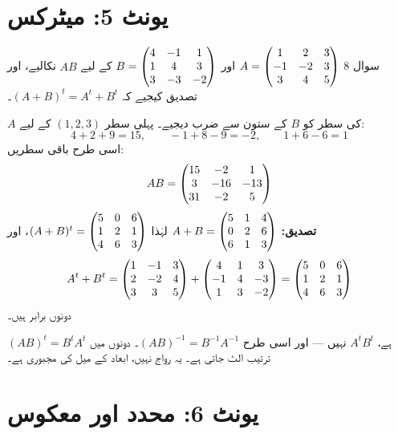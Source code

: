 \section*{یونٹ \textenglish{5}: میٹرکس}

\begin{sawal}{سوال \textenglish{8}}
\(A=\begin{pmatrix}1&2&3\\-1&-2&3\\3&4&5\end{pmatrix}\) اور \(B=\begin{pmatrix}4&-1&1\\1&4&3\\3&-3&-2\end{pmatrix}\) کے لیے
\(AB\) نکالیے، اور تصدیق کیجیے کہ \((A+B)^{t}=A^{t}+B^{t}\)۔
\end{sawal}

\begin{hal}
\(A\) کی سطر کو \(B\) کے ستون سے ضرب دیجیے۔ پہلی سطر \((1,2,3)\) کے لیے:
\[
4+2+9=15,\qquad -1+8-9=-2,\qquad 1+6-6=1
\]
اسی طرح باقی سطریں:
\[
AB=\begin{pmatrix}15&-2&1\\3&-16&-13\\31&-2&5\end{pmatrix}
\]
\textbf{تصدیق:} \(A+B=\begin{pmatrix}5&1&4\\0&2&6\\6&1&3\end{pmatrix}\) لہٰذا
\((A+B)^{t}=\begin{pmatrix}5&0&6\\1&2&1\\4&6&3\end{pmatrix}\)، اور
\[
A^{t}+B^{t}=\begin{pmatrix}1&-1&3\\2&-2&4\\3&3&5\end{pmatrix}+\begin{pmatrix}4&1&3\\-1&4&-3\\1&3&-2\end{pmatrix}
=\begin{pmatrix}5&0&6\\1&2&1\\4&6&3\end{pmatrix}
\]
دونوں برابر ہیں۔

\end{hal}

\begin{ghalti}
\((AB)^{t}=B^{t}A^{t}\) ہے، \(A^{t}B^{t}\) نہیں --- اور اسی طرح
\((AB)^{-1}=B^{-1}A^{-1}\)۔ دونوں میں ترتیب الٹ جاتی ہے۔ یہ رواج نہیں، ابعاد
کے میل کی مجبوری ہے۔
\end{ghalti}

\section*{یونٹ \textenglish{6}: محدد اور معکوس}

